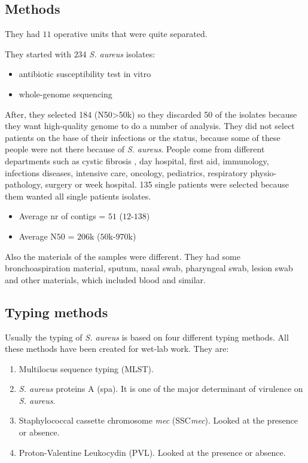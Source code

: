 \subsection{Methods}

They had $11$ operative units that were quite separated. 

They started with $234$ \emph{S. aureus} isolates:

\begin{itemize}
    \item antibiotic susceptibility test in vitro
    \item whole-genome sequencing
\end{itemize}

After, they selected 184 (N50>50k) so they discarded 50 of the isolates because they want high-quality genome to do a number of analysis.
They did not select patients on the base of their infections or the status, because some of these people were not there because of \emph{S. aureus}.
People come from different departments such as cystic fibrosis , day hospital, first aid,  immunology, infections diseases, intensive care, oncology, pediatrics, respiratory physio-pathology, surgery or week hospital. 
135 single patients were selected because them wanted all single patients isolates. 

\begin{itemize}
    \item Average nr of contigs = $51$ ($12$-$138$)
    \item Average N$50$ = $206$k ($50$k-$970$k)
\end{itemize}

Also the materials of the samples were different. They had some bronchoaspiration material, sputum, nasal swab, pharyngeal swab, lesion swab and other materials, which included blood and similar.


\subsection{Typing methods}

Usually the typing of \emph{S. aureus} is based on four different typing methods. All these methods have been created for wet-lab work. They are:

\begin{enumerate}
    \item Multilocus sequence typing (MLST).
    \item \emph{S. aureus} proteins A (spa). It is one of the major determinant of virulence on \emph{S. aureus}.
    \item Staphylococcal cassette chromosome \emph{mec} (SSC\emph{mec}). Looked at the presence or absence.
    \item Proton-Valentine Leukocydin (PVL). Looked at the presence or absence.
\end{enumerate}

